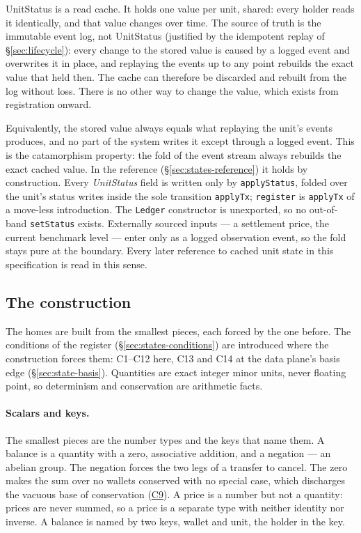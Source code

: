 UnitStatus is a read cache. It holds one value per unit, shared: every holder reads it
identically, and that value changes over time. The source of truth is the immutable event
log, not UnitStatus (justified by the idempotent replay of \S\ref{sec:lifecycle}): every
change to the stored value is caused by a logged event and overwrites it in place, and
replaying the events up to any point rebuilds the exact value that held then. The cache
can therefore be discarded and rebuilt from the log without loss. There is no other way to
change the value, which exists from registration onward.

Equivalently, the stored value always equals what replaying the unit's events produces,
and no part of the system writes it except through a logged event. This is the
catamorphism property: the fold of the event stream always rebuilds the exact cached
value. In the reference (\S\ref{sec:states-reference}) it holds by construction. Every
\emph{UnitStatus} field is written only by \texttt{applyStatus}, folded over the unit's
status writes inside the sole transition \texttt{applyTx}; \texttt{register} is
\texttt{applyTx} of a move-less introduction. The \texttt{Ledger} constructor is
unexported, so no out-of-band \texttt{setStatus} exists. Externally sourced inputs --- a
settlement price, the current benchmark level --- enter only as a logged observation
event, so the fold stays pure at the boundary. Every later reference to cached unit state
in this specification is read in this sense.

\subsection{The construction}
\label{sec:states-construction}

The homes are built from the smallest pieces, each forced by the one before. The
conditions of the register (\S\ref{sec:states-conditions}) are introduced where the
construction forces them: C1--C12 here, C13 and C14 at the data plane's basis edge
(\S\ref{sec:state-basis}). Quantities are exact integer minor units, never floating
point, so determinism and conservation are arithmetic facts.

\paragraph{Scalars and keys.}
The smallest pieces are the number types and the keys that name them. A balance is a
quantity with a zero, associative addition, and a negation --- an abelian group. The
negation forces the two legs of a transfer to cancel. The zero makes the sum over no
wallets conserved with no special case, which discharges the vacuous base of conservation
(\hyperref[cond:C9]{C9}). A price is a number but not a quantity: prices are never
summed, so a price is a separate type with neither identity nor inverse. A balance is
named by two keys, wallet and unit, the holder in the key.

